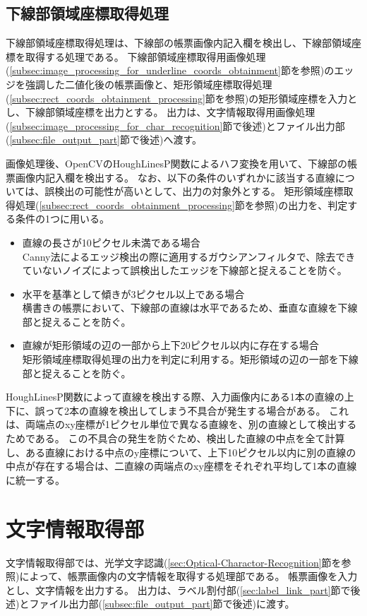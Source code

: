 \subsection{下線部領域座標取得処理}\label{subsec:underline_coords_obtainment_processing}
下線部領域座標取得処理は、下線部の帳票画像内記入欄を検出し、下線部領域座標を取得する処理である。
下線部領域座標取得用画像処理(\ref{subsec:image_processing_for_underline_coords_obtainment}節を参照)のエッジを強調した二値化後の帳票画像と、矩形領域座標取得処理(\ref{subsec:rect_coords_obtainment_processing}節を参照)の矩形領域座標を入力とし、下線部領域座標を出力とする。
出力は、文字情報取得用画像処理(\ref{subsec:image_processing_for_char_recognition}節で後述)とファイル出力部(\ref{subsec:file_output_part}節で後述)へ渡す。

画像処理後、OpenCVのHoughLinesP関数によるハフ変換を用いて、下線部の帳票画像内記入欄を検出する。
なお、以下の条件のいずれかに該当する直線については、誤検出の可能性が高いとして、出力の対象外とする。
矩形領域座標取得処理(\ref{subsec:rect_coords_obtainment_processing}節を参照)の出力を、判定する条件の1つに用いる。

\begin{itemize}
    \item 直線の長さが10ピクセル未満である場合\\
        Canny法によるエッジ検出の際に適用するガウシアンフィルタで、除去できていないノイズによって誤検出したエッジを下線部と捉えることを防ぐ。
    \item 水平を基準として傾きが3ピクセル以上である場合\\
        横書きの帳票において、下線部の直線は水平であるため、垂直な直線を下線部と捉えることを防ぐ。
    \item 直線が矩形領域の辺の一部から上下20ピクセル以内に存在する場合\\
        矩形領域座標取得処理の出力を判定に利用する。矩形領域の辺の一部を下線部と捉えることを防ぐ。
\end{itemize}

HoughLinesP関数によって直線を検出する際、入力画像内にある1本の直線の上下に、誤って2本の直線を検出してしまう不具合が発生する場合がある。
これは、両端点のxy座標が1ピクセル単位で異なる直線を、別の直線として検出するためである。
この不具合の発生を防ぐため、検出した直線の中点を全て計算し、ある直線における中点のy座標について、上下10ピクセル以内に別の直線の中点が存在する場合は、二直線の両端点のxy座標をそれぞれ平均して1本の直線に統一する。

\section{文字情報取得部}\label{sec:OCR_part}
文字情報取得部では、光学文字認識(\ref{sec:Optical-Charactor-Recognition}節を参照)によって、帳票画像内の文字情報を取得する処理部である。
帳票画像を入力とし、文字情報を出力する。
出力は、ラベル割付部(\ref{sec:label_link_part}節で後述)とファイル出力部(\ref{subsec:file_output_part}節で後述)に渡す。

